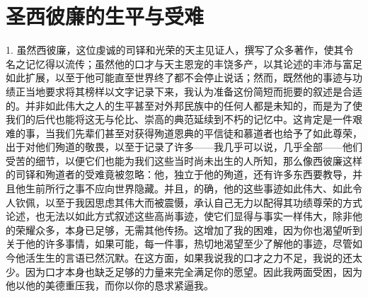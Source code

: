 
\chapter{圣西彼廉的生平与受难}


\par

1. 虽然西彼廉，这位虔诚的司铎和光荣的天主见证人，撰写了众多著作，使其令名之记忆得以流传；虽然他的口才与天主恩宠的丰饶多产，以其论述的丰沛与富足如此扩展，以至于他可能直至世界终了都不会停止说话；然而，既然他的事迹与功绩正当地要求将其榜样以文字记录下来，我认为准备这份简短而扼要的叙述是合适的。并非如此伟大之人的生平甚至对外邦民族中的任何人都是未知的，而是为了使我们的后代也能将这无与伦比、崇高的典范延续到不朽的记忆中。这肯定是一件艰难的事，当我们先辈们甚至对获得殉道恩典的平信徒和慕道者也给予了如此尊荣，出于对他们殉道的敬畏，以至于记录了许多——我几乎可以说，几乎全部——他们受苦的细节，以便它们也能为我们这些当时尚未出生的人所知，那么像西彼廉这样的司铎和殉道者的受难竟被忽略：他，独立于他的殉道，还有许多东西要教导，并且他生前所行之事不应向世界隐藏。并且，的确，他的这些事迹如此伟大、如此令人钦佩，以至于我因思虑其伟大而被震慑，承认自己无力以配得其功绩尊荣的方式论述，也无法以如此方式叙述这些高尚事迹，使它们显得与事实一样伟大，除非他的荣耀众多，本身已足够，无需其他传扬。这增加了我的困难，因为你也渴望听到关于他的许多事情，如果可能，每一件事，热切地渴望至少了解他的事迹，尽管如今他活生生的言语已然沉默。在这方面，如果我说我的口才之力不足，我说的还太少。因为口才本身也缺乏足够的力量来完全满足你的愿望。因此我两面受困，因为他以他的美德重压我，而你以你的恳求紧逼我。\par

